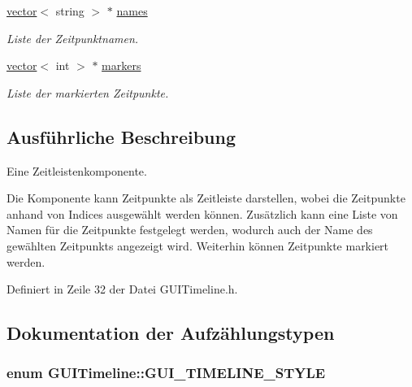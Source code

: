 \begin{DoxyCompactItemize}
\hyperlink{classstd_1_1vector}{vector}$<$ string $>$ $\ast$ \hyperlink{classGUITimeline_adcdd8d58db7851c24ab9dfdfe1377ffb}{names}
\begin{DoxyCompactList}\small\item\em Liste der Zeitpunktnamen. \end{DoxyCompactList}\item 
\hyperlink{classstd_1_1vector}{vector}$<$ int $>$ $\ast$ \hyperlink{classGUITimeline_a8e20b6ed00d7c48716256fffdcfa608a}{markers}
\begin{DoxyCompactList}\small\item\em Liste der markierten Zeitpunkte. \end{DoxyCompactList}\end{DoxyCompactItemize}


\subsection{Ausführliche Beschreibung}
Eine Zeitleistenkomponente. 

Die Komponente kann Zeitpunkte als Zeitleiste darstellen, wobei die Zeitpunkte anhand von Indices ausgewählt werden können. Zusätzlich kann eine Liste von Namen für die Zeitpunkte festgelegt werden, wodurch auch der Name des gewählten Zeitpunkts angezeigt wird. Weiterhin können Zeitpunkte markiert werden. 

Definiert in Zeile 32 der Datei G\-U\-I\-Timeline.\-h.



\subsection{Dokumentation der Aufzählungstypen}
\hypertarget{classGUITimeline_a56f1cf170a8c077a0b94d19a0eba8c94}{
\subsubsection[{G\-U\-I\-\_\-\-T\-I\-M\-E\-L\-I\-N\-E\-\_\-\-S\-T\-Y\-L\-E}]{\setlength{\rightskip}{0pt plus 5cm}enum {\bf G\-U\-I\-Timeline\-::\-G\-U\-I\-\_\-\-T\-I\-M\-E\-L\-I\-N\-E\-\_\-\-S\-T\-Y\-L\-E}}}\label{classGUITimeline_a56f1cf170a8c077a0b94d19a0eba8c94}


